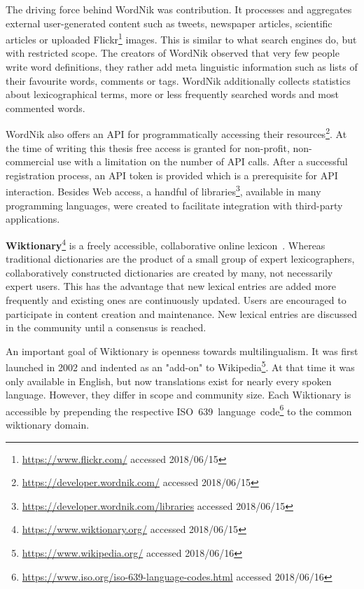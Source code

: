 \documentclass[draft,final]{vutinfth} %
\begin{document}
The driving force behind WordNik was contribution. It processes and aggregates external user-generated content such as tweets, newspaper articles, scientific articles or uploaded Flickr\footnote{\url{https://www.flickr.com/} accessed 2018/06/15} images. This is similar to what search engines do, but with restricted scope. The creators of WordNik observed that very few people write word definitions, they rather add meta linguistic information such as lists of their favourite words, comments or tags. WordNik additionally collects statistics about lexicographical terms, more or less frequently searched words and most commented words. 

WordNik also offers an API for programmatically accessing their resources\footnote{\url{https://developer.wordnik.com/} accessed 2018/06/15}. At the time of writing this thesis free access is granted for non-profit, non-commercial use with a limitation on the number of API calls. 
After a successful registration process, an API token is provided which is a prerequisite for API interaction. Besides Web access, a handful of libraries\footnote{\url{https://developer.wordnik.com/libraries} accessed 2018/06/15}, available in many programming languages, were created to facilitate integration with third-party applications. 

\textbf{Wiktionary}\footnote{\url{https://www.wiktionary.org/} accessed 2018/06/15} is a freely accessible, collaborative online lexicon~\cite{granger2012}. Whereas traditional dictionaries are the product of a small group of expert lexicographers, collaboratively constructed dictionaries are created by many, not necessarily expert users. This has the advantage that new lexical entries are added more frequently and existing ones are continuously updated. Users are encouraged to participate in content creation and maintenance. New lexical entries are discussed in the community until a consensus is reached. 

An important goal of Wiktionary is openness towards multilingualism. It was first launched in 2002 and indented as an "add-on" to Wikipedia\footnote{\url{https://www.wikipedia.org/} accessed 2018/06/16}. At that time it was only available in English, but now translations exist for nearly every spoken language. However, they differ in scope and community size. Each Wiktionary is accessible by prepending the respective ISO~639~language~code\footnote{\url{https://www.iso.org/iso-639-language-codes.html} accessed 2018/06/16} to the common wiktionary domain.
\end{document}
